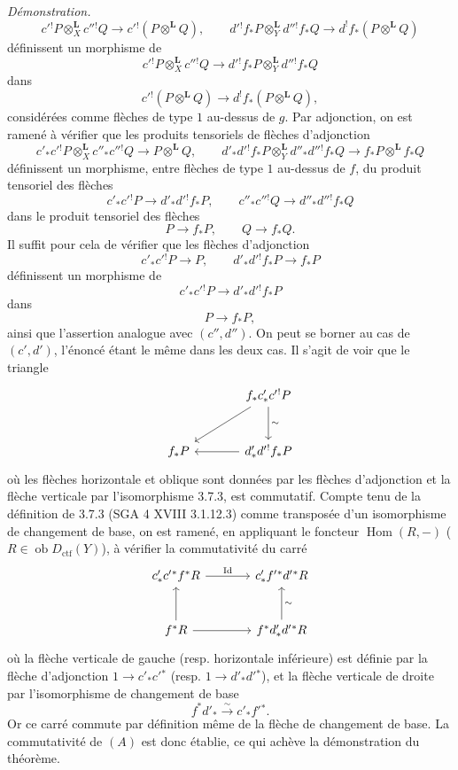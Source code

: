 \documentclass[11pt]{article}
\newenvironment{prooftext}[1][Proof]{\par\noindent\emph{#1.}\ }{\par\medskip}
\DeclareMathOperator{\Hom}{Hom}
\newcommand{\ob}{\operatorname{ob}}
\providecommand{\Dctf}{D_{\mathrm{ctf}}}
\providecommand{\Id}{\mathrm{Id}}
\providecommand{\lisom}{\xrightarrow{\sim}}
\providecommand{\Dctf}{D_{\mathrm{ctf}}}
\providecommand{\Hom}{\operatorname{Hom}}
\providecommand{\ob}{\operatorname{ob}}
\providecommand{\Hom}{\operatorname{Hom}}
\begin{document}
\begin{prooftext}[Démonstration]
\[
c'{}^!P\otimes_X^{\mathbf L}c''{}^!Q\longrightarrow c'{}^!(P\otimes^{\mathbf L}Q),\qquad
d'{}^!f_*P\otimes_Y^{\mathbf L}d''{}^!f_*Q\longrightarrow d^!f_*(P\otimes^{\mathbf L}Q)
\]
définissent un morphisme de
\[
c'{}^!P\otimes_X^{\mathbf L}c''{}^!Q\longrightarrow d'{}^!f_*P\otimes_Y^{\mathbf L}d''{}^!f_*Q
\]
dans
\[
c'{}^!(P\otimes^{\mathbf L}Q)\longrightarrow d^!f_*(P\otimes^{\mathbf L}Q),
\]
considérées comme flèches de type $1$ au-dessus de $g$. Par adjonction, on est ramené à vérifier que les produits tensoriels de flèches d'adjonction
\[
c'_*c'{}^!P\otimes_X^{\mathbf L}c''_*c''{}^!Q\longrightarrow P\otimes^{\mathbf L}Q,
\qquad
d'_*d'{}^!f_*P\otimes_Y^{\mathbf L}d''_*d''{}^!f_*Q
\longrightarrow f_*P\otimes^{\mathbf L}f_*Q
\]
définissent un morphisme, entre flèches de type $1$ au-dessus de $f$, du produit tensoriel des flèches
\[
c'_*c'{}^!P\longrightarrow d'_*d'{}^!f_*P,\qquad
c''_*c''{}^!Q\longrightarrow d''_*d''{}^!f_*Q
\]
dans le produit tensoriel des flèches
\[
P\longrightarrow f_*P,\qquad Q\longrightarrow f_*Q.
\]
Il suffit pour cela de vérifier que les flèches d'adjonction
\[
c'_*c'{}^!P\longrightarrow P,\qquad d'_*d'{}^!f_*P\longrightarrow f_*P
\]
définissent un morphisme de
\[
c'_*c'{}^!P\longrightarrow d'_*d'{}^!f_*P
\]
dans
\[
P\longrightarrow f_*P,
\]
ainsi que l'assertion analogue avec $(c'',d'')$. On peut se borner au cas de $(c',d')$, l'énoncé étant le même dans les deux cas. Il s'agit de voir que le triangle
\[
\begin{tikzcd}[column sep=large,row sep=large]
& f_*c'_*c'{}^!P \arrow[d,"\sim"]\arrow[dl]\\
f_*P & d'_*d'{}^!f_*P\arrow[l]
\end{tikzcd}
\]
où les flèches horizontale et oblique sont données par les flèches d'adjonction et la flèche verticale par l'isomorphisme 3.7.3, est commutatif. Compte tenu de la définition de 3.7.3 (SGA 4 XVIII 3.1.12.3) comme transposée d'un isomorphisme de changement de base, on est ramené, en appliquant le foncteur $\Hom(R,-)$ ($R\in\ob\Dctf(Y)$), à vérifier la commutativité du carré
\[
\begin{tikzcd}[column sep=large,row sep=large]
c'_*c'{}^*f^*R \arrow[r,"\Id"] &
c'_*f'{}^*d'{}^*R\\
f^*R \arrow[u] \arrow[r] &
f^*d'_*d'{}^*R\arrow[u,"\sim"']
\end{tikzcd}
\]
où la flèche verticale de gauche (resp. horizontale inférieure) est définie par la flèche d'adjonction $1\longrightarrow c'_*c'{}^*$ (resp. $1\longrightarrow d'_*d'{}^*$), et la flèche verticale de droite par l'isomorphisme de changement de base
\[
f^*d'_*\lisom c'_*f'{}^*.
\]
Or ce carré commute par définition même de la flèche de changement de base. La commutativité de $(A)$ est donc établie, ce qui achève la démonstration du théorème.
\end{prooftext}
\end{document}

